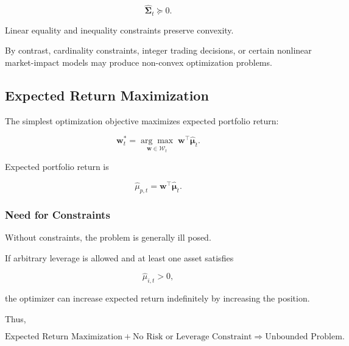 \documentclass[11pt,a4paper]{article}
\begin{document}
\begin{equation}
\widehat{\boldsymbol{\Sigma}}_t
\succeq
0.
\end{equation}

Linear equality and inequality constraints preserve convexity.

By contrast, cardinality constraints, integer trading decisions, or certain
nonlinear market-impact models may produce non-convex optimization problems.


\subsection{Expected Return Maximization}
\label{subsec:expected_return_maximization}

The simplest optimization objective maximizes expected portfolio return:

\begin{equation}
\boxed{
\mathbf{w}_t^{*}
=
\underset{\mathbf{w}\in\mathcal{W}_t}{\arg\max}
\;
\mathbf{w}^{\top}
\widehat{\boldsymbol{\mu}}_t.
}
\end{equation}

Expected portfolio return is

\begin{equation}
\boxed{
\widehat{\mu}_{p,t}
=
\mathbf{w}^{\top}
\widehat{\boldsymbol{\mu}}_t.
}
\end{equation}


\subsubsection{Need for Constraints}

Without constraints, the problem is generally ill posed.

If arbitrary leverage is allowed and at least one asset satisfies

\begin{equation}
\widehat{\mu}_{i,t}>0,
\end{equation}

the optimizer can increase expected return indefinitely by increasing the
position.

Thus,

\begin{equation}
\boxed{
\text{Expected Return Maximization}
+
\text{No Risk or Leverage Constraint}
\Rightarrow
\text{Unbounded Problem}.
}
\end{equation}
\end{document}

